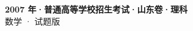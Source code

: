 \documentclass[zihao=-4, a4paper]{ctexart}
\begin{document}
\begin{center}
  {\Large\bfseries 2007 年·普通高等学校招生考试·山东卷·理科}\\[4pt]
  {\large 数学 · 试题版}
\end{center}
\medskip
{}

\end{document}
